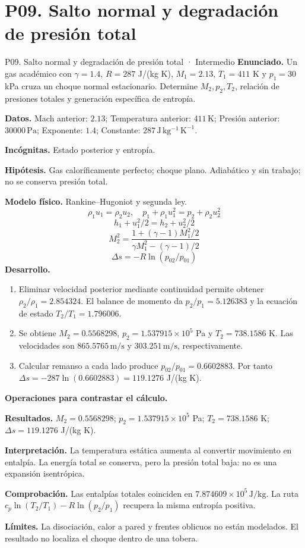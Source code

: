 \section{P09. Salto normal y degradación de presión total}
\begin{studiumworked}{P09. Salto normal y degradación de presión total · Intermedio}
\textbf{Enunciado.} Un gas académico con $\gamma=1.4$, $R=287$ J/(kg K), $M_1=2.13$, $T_1=411$ K y $p_1=30$ kPa cruza un choque normal estacionario. Determine $M_2,p_2,T_2$, relación de presiones totales y generación específica de entropía.

\textbf{Datos.} Mach anterior: $2.13$; Temperatura anterior: $411\,\mathrm{K}$; Presión anterior: $30000\,\mathrm{Pa}$; Exponente: $1.4$; Constante: $287\,\mathrm{J\,kg^{-1}\,K^{-1}}$.

\textbf{Incógnitas.} Estado posterior y entropía.

\textbf{Hipótesis.} Gas caloríficamente perfecto; choque plano. Adiabático y sin trabajo; no se conserva presión total.

\textbf{Modelo físico.} Rankine--Hugoniot y segunda ley.
\[\rho_1u_1=\rho_2u_2,\quad p_1+\rho_1u_1^2=p_2+\rho_2u_2^2\]
\[h_1+u_1^2/2=h_2+u_2^2/2\]
\[M_2^2=\frac{1+(\gamma-1)M_1^2/2}{\gamma M_1^2-(\gamma-1)/2}\]
\[\Delta s=-R\ln(p_{02}/p_{01})\]
\textbf{Desarrollo.}
\begin{enumerate}
\item Eliminar velocidad posterior mediante continuidad permite obtener $\rho_2/\rho_1=2.854324$. El balance de momento da $p_2/p_1=5.126383$ y la ecuación de estado $T_2/T_1=1.796006$.
\item Se obtiene $M_2=0.5568298$, $p_2=1.537915\times10^{5}$ Pa y $T_2=738.1586$ K. Las velocidades son $865.5765\,\mathrm{m/s}$ y $303.251\,\mathrm{m/s}$, respectivamente.
\item Calcular remanso a cada lado produce $p_{02}/p_{01}=0.6602883$. Por tanto $\Delta s=-287\ln(0.6602883)=119.1276$ J/(kg K).
\end{enumerate}
\textbf{Operaciones para contrastar el cálculo.}

\textbf{Resultados.} $M_2=0.5568298$; $p_2=1.537915\times10^{5}$ Pa; $T_2=738.1586$ K; $\Delta s=119.1276$ J/(kg K).

\textbf{Interpretación.} La temperatura estática aumenta al convertir movimiento en entalpía. La energía total se conserva, pero la presión total baja: no es una expansión isentrópica.

\textbf{Comprobación.} Las entalpías totales coinciden en $7.874609\times10^{5}\,\mathrm{J/kg}$. La ruta $c_p\ln(T_2/T_1)-R\ln(p_2/p_1)$ recupera la misma entropía positiva.

\textbf{Límites.} La disociación, calor a pared y frentes oblicuos no están modelados. El resultado no localiza el choque dentro de una tobera.
\end{studiumworked}
